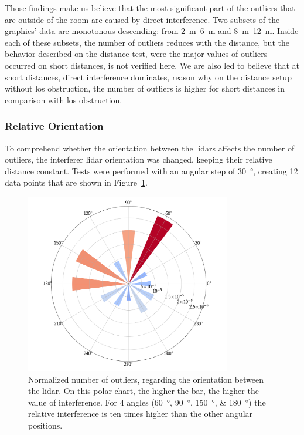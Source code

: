 Those findings make us believe that the most significant part of the outliers that are outside of the room are caused by direct interference. Two subsets of the graphics' data are monotonous descending: from \SIrange{2}{6}{\meter} and \SIrange{8}{12}{\meter}. Inside each of these subsets, the number of outliers reduces with the distance, but the behavior described on the distance test, were the major values of outliers occurred on short distances, is not verified here. We are also led to believe that at short distances, direct interference dominates, reason why on the distance setup without \ac{los} obstruction, the number of outliers is higher for short distances in comparison with \ac{los} obstruction.

\subsubsection{Relative Orientation}
To comprehend whether the orientation between the \acp{lidar} affects the number of outliers, the interferer \ac{lidar} orientation was changed, keeping their relative distance constant. Tests were performed with an angular step of \SI{30}{\degree}, creating 12 data points that are shown in Figure~\ref{fig:box-filter-outliers-direction}.

\begin{figure}[!ht]
\centering
\includegraphics[width=0.8\textwidth]{img/lidar-interference/box-filtering/interference-box-filter-outliers-direction.png}
\caption[Relative number of outliers when the relative orientation between the \acsp{lidar} is varied on \acs{irislab}.]{Normalized number of outliers, regarding the orientation between the \ac{lidar}. On this polar chart, the higher the bar, the higher the value of interference. For 4 angles (\SIlist[list-final-separator = {, }]{60; 90; 150; 180}{\degree}) the relative interference is ten times higher than the other angular positions.}
\label{fig:box-filter-outliers-direction}
\end{figure}

